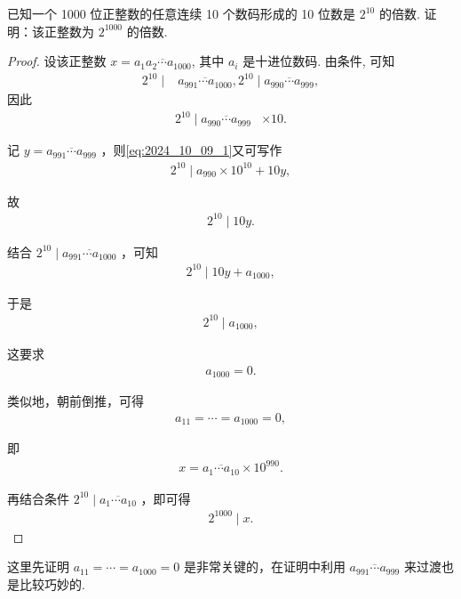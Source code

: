 \begin{example}
已知一个 1000 位正整数的任意连续 10 个数码形成的 10 位数是 $2^{10}$ 的倍数. 证明：该正整数为 $2^{1000}$ 的倍数. 
\end{example}
\begin{proof}
设该正整数 $x=\overline{a_{1} a_{2} \cdots a_{1000}}$, 其中 $a_{i}$ 是十进位数码. 由条件, 可知
\begin{align}
2^{10} \mid & \overline{a_{991} \cdots a_{1000}}, 2^{10} \mid \overline{a_{990} \cdots a_{999}},
\end{align}
因此
\begin{align}\label{eq:2024_10_09_1}
2^{10} \mid \overline{a_{990} \cdots a_{999}} & \times 10.
\end{align}

记 $y=\overline{a_{991} \cdots a_{999}}$ ，则\autoref{eq:2024_10_09_1}又可写作
\begin{align*}
2^{10} \mid a_{990} \times 10^{10}+10 y,
\end{align*}

故
\begin{align*}
2^{10} \mid 10 y.
\end{align*}

结合 $2^{10} \mid \overline{a_{991} \cdots a_{1000}}$ ，可知
\begin{align*}
2^{10} \mid 10 y+a_{1000},
\end{align*}

于是
\begin{align*}
2^{10} \mid a_{1000},
\end{align*}

这要求
\begin{align*}
a_{1000}=0.
\end{align*}

类似地，朝前倒推，可得
\begin{align*}
a_{11}=\cdots=a_{1000}=0,
\end{align*}

即
\begin{align*}
x=\overline{a_{1} \cdots a_{10}} \times 10^{990}.
\end{align*}

再结合条件 $2^{10} \mid \overline{a_{1} \cdots a_{10}}$ ，即可得
\begin{align*}
2^{1000} \mid x.
\end{align*}
\end{proof}
\begin{note}
这里先证明 $a_{11}=\cdots=a_{1000}=0$ 是非常关键的，在证明中利用 $\overline{a_{991} \cdots a_{999}}$ 来过渡也是比较巧妙的. 
\end{note}

